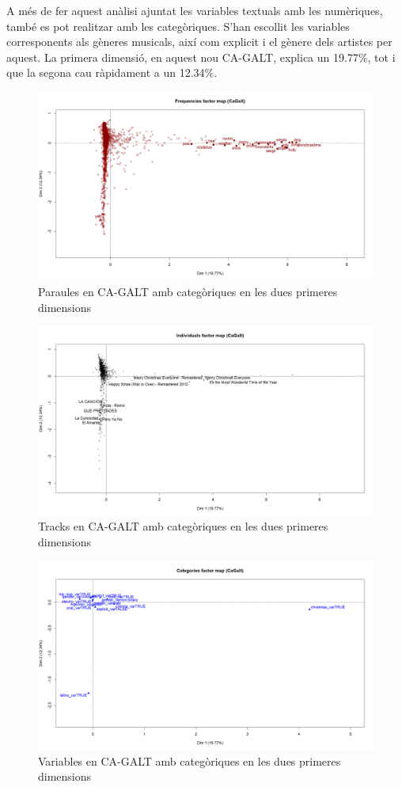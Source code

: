 A més de fer aquest anàlisi ajuntat les variables textuals amb les numèriques, també es pot realitzar amb les categòriques. S'han escollit les variables corresponents als gèneres musicals, així com explicit i el gènere dels artistes per aquest. La primera dimensió, en aquest nou CA-GALT, explica un 19.77\%, tot i que la segona cau ràpidament a un 12.34\%.

\begin{figure}[H]
    \centering
    \includegraphics[width=0.7\linewidth]{Images//8_Textual//Analysis/cagalt2_words_12.png}
    \caption{Paraules en CA-GALT amb categòriques en les dues primeres dimensions}
    \label{fig:textual_cagaltcat_words12}
\end{figure}

\begin{figure}[H]
    \centering
    \includegraphics[width=0.7\linewidth]{Images//8_Textual//Analysis/cagalt2_tracks_12.png}
    \caption{Tracks en CA-GALT amb categòriques en les dues primeres dimensions}
    \label{fig:textual_cagaltcat_tracks12}
\end{figure}

\begin{figure}[H]
    \centering
    \includegraphics[width=0.7\linewidth]{Images//8_Textual//Analysis/cagalt2_quali_12.png}
    \caption{Variables en CA-GALT amb categòriques en les dues primeres dimensions}
    \label{fig:textual_cagaltcat_vars12}
\end{figure}

